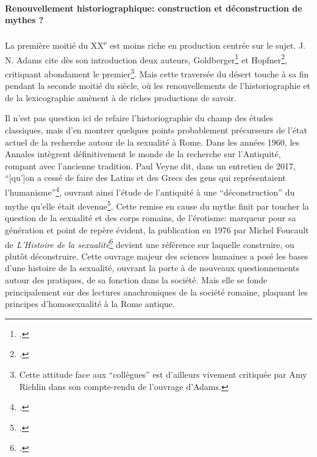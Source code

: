 
\paragraph{Renouvellement historiographique: construction et déconstruction de mythes ?}

La première moitié du XX\textsuperscript{e} est moins riche en production centrée sur le sujet. J. N. Adams cite dès son introduction deux auteurs, Goldberger\footcite{goldberger_kraftausdrucke_1929, goldberger_kraftausdrucke_1931} et Hopfner\footcite{hopfner_sexualleben_1938}, critiquant abondament le premier\footnote{Cette attitude face aux \enquote{collègues} est d'ailleurs vivement critiquée par Amy Richlin dans son compte-rendu de l'ouvrage d'Adams.}. Mais cette traversée du désert touche à sa fin pendant la seconde moitié du siècle, où les renouvellements de l'historiographie et de la lexicographie amènent à de riches productions de savoir.

Il n'est pas question ici de refaire l'historiographie du champ des études classiques, mais d'en montrer quelques points probablement précurseurs de l'état actuel de la recherche autour de la sexualité à Rome. Dans les années 1960, les Annales intègrent définitivement le monde de la recherche sur l'Antiquité, rompant avec l'ancienne tradition. Paul Veyne dit, dans un entretien de 2017, \enquote{[qu']on a cessé de faire des Latins et des Grecs des gens qui représentaient l’humanisme}\footcite{paul_veyne_entretien_2017}, ouvrant ainsi l'étude de l'antiquité à une \enquote{déconstruction} du mythe qu'elle était devenue\footcite{dupont_antiquite_2013}. Cette remise en cause du mythe finit par toucher la question de la sexualité et des corps romains, de l'érotisme: marqueur pour sa génération et point de repère évident, la publication en 1976 par Michel Foucault de \textit{L'Histoire de la sexualité}\footcite{foucault_histoire_1976} devient une référence sur laquelle construire, ou plutôt déconstruire. Cette ouvrage majeur des sciences humaines a posé les bases d'une histoire de la sexualité, ouvrant la porte à de nouveaux questionnements autour des pratiques, de sa fonction dans la société. Mais elle se fonde principalement sur des lectures anachroniques de la société romaine, plaquant les principes d'homosexualité à la Rome antique.

